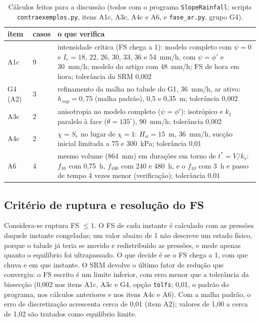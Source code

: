 \begin{table}[h!]
\centering\small
\caption{C\'alculos feitos para a discuss\~ao (todos com o programa \texttt{SlopeRainfall}; scripts
\texttt{contraexemplos.py}, itens A1c, A3c, A4c e A6, e \texttt{fase\_ar.py}, grupo G4).}\label{tab:disc_casos}
\begin{tabular}{llp{8.6cm}}
\toprule
item & casos & o que verifica\\
\midrule
A1c & 9 & intensidade cr\'itica (FS chega a 1): modelo completo com $\psi=0$ e $I_r=18$, 22, 26, 30, 33, 36 e 54~mm/h,
com $\psi=\phi'$ e 30~mm/h; modelo do artigo com 48~mm/h; FS de hora em hora; toler\^ancia do SRM 0,002\\
G4 (A2) & 3 & refinamento da malha no talude do G1, 36~mm/h, ar ativo: $h_{sup}=0{,}75$ (malha padr\~ao), 0,5 e
0,35~m; toler\^ancia 0,002\\
A3c & 2 & anisotropia no modelo completo ($\psi=\phi'$): isotr\'opico e $k_1$ paralelo \`a face ($\theta=135^\circ$),
90~mm/h; toler\^ancia 0,002\\
A4c & 2 & $\chi=S_e$ no lugar de $\chi=1$: $H_w=15$~m, 36~mm/h, suc\c{c}\~ao inicial limitada a 75 e 300~kPa;
toler\^ancia 0,01\\
A6 & 4 & mesmo volume (864~mm) em dura\c{c}\~oes em torno de $t^*=V/k_s$: $f_{10}$ com 0,75~h, $f_{100}$ com 240 e
480~h, e o $f_{10}$ com 3~h e passo de tempo 4 vezes menor (verifica\c{c}\~ao); toler\^ancia 0,01\\
\bottomrule
\end{tabular}
\end{table}

\subsection{Crit\'erio de ruptura e resolu\c{c}\~ao do FS}

Considera-se ruptura FS $\le1$. O FS de cada instante \'e calculado com as press\~oes daquele instante congeladas; um
valor abaixo de 1 n\~ao descreve um estado f\'isico, porque o talude j\'a teria se movido e redistribu\'ido as
press\~oes, e mede apenas quanto o equil\'ibrio foi ultrapassado. O que decide \'e se o FS chega a 1, com que chuva e
em que instante. O SRM devolve o \'ultimo fator de redu\c{c}\~ao que convergiu: o FS escrito \'e um limite inferior,
com erro menor que a toler\^ancia da bissec\c{c}\~ao (0,002 nos itens A1c, A3c e G4, op\c{c}\~ao \texttt{tolfs}; 0,01, o
padr\~ao do programa, nos c\'alculos anteriores e nos itens A4c e A6). Com a malha padr\~ao, o erro de
discretiza\c{c}\~ao acrescenta cerca de 0,01 (item A2); valores de 1,00 a cerca de 1,02 s\~ao tratados como
equil\'ibrio limite.


